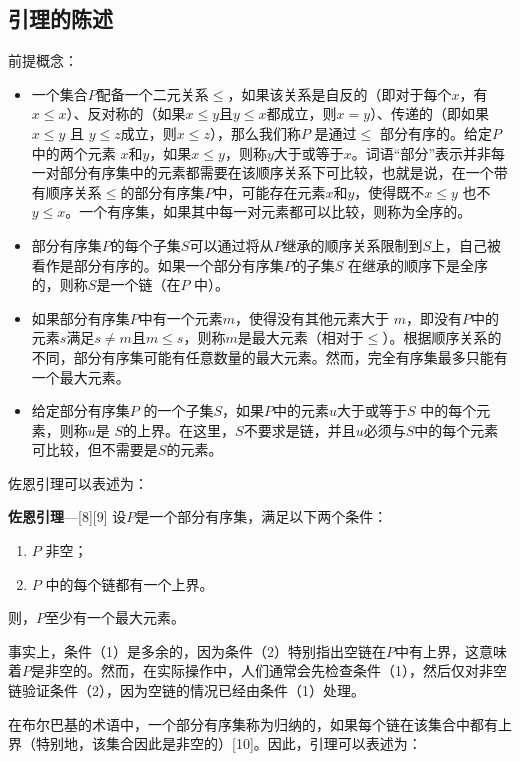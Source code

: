 \subsection{引理的陈述}  
前提概念：
\begin{itemize}
\item 一个集合\( P \)配备一个二元关系\( \leq \)，如果该关系是自反的（即对于每个\( x \)，有\( x \leq x \)）、反对称的（如果\( x \leq y \)且\( y \leq x \)都成立，则\( x = y \)）、传递的（即如果\( x \leq y \) 且 \( y \leq z \)成立，则\( x \leq z \)），那么我们称\( P \) 是通过\( \leq \) 部分有序的。给定\( P \)中的两个元素 \( x \)和\( y \)，如果\( x \leq y \)，则称\( y \)大于或等于\( x \)。词语“部分”表示并非每一对部分有序集中的元素都需要在该顺序关系下可比较，也就是说，在一个带有顺序关系\( \leq \)的部分有序集\( P \)中，可能存在元素\( x \)和\( y \)，使得既不\( x \leq y \) 也不\( y \leq x \)。一个有序集，如果其中每一对元素都可以比较，则称为全序的。
\item 部分有序集\( P \)的每个子集\( S \)可以通过将从\( P \)继承的顺序关系限制到\( S \)上，自己被看作是部分有序的。如果一个部分有序集\( P \)的子集\( S \) 在继承的顺序下是全序的，则称\( S \)是一个链（在\( P \) 中）。
\item 如果部分有序集\( P \)中有一个元素\( m \)，使得没有其他元素大于 \( m \)，即没有\( P \)中的元素\( s \)满足\( s \neq m \)且\( m \leq s \)，则称\( m \)是最大元素（相对于\( \leq \)）。根据顺序关系的不同，部分有序集可能有任意数量的最大元素。然而，完全有序集最多只能有一个最大元素。
\item 给定部分有序集\( P \) 的一个子集\( S \)，如果\( P \)中的元素\( u \)大于或等于\( S \) 中的每个元素，则称\( u \)是 \( S \)的上界。在这里，\( S \)不要求是链，并且\( u \)必须与\( S \)中的每个元素可比较，但不需要是\( S \)的元素。
\end{itemize}
佐恩引理可以表述为：

\textbf{佐恩引理}—[8][9] 设\( P \)是一个部分有序集，满足以下两个条件：
\begin{enumerate}
\item \( P \) 非空；
\item \( P \) 中的每个链都有一个上界。
\end{enumerate}
则，\( P \)至少有一个最大元素。

事实上，条件（1）是多余的，因为条件（2）特别指出空链在\( P \)中有上界，这意味着\( P \)是非空的。然而，在实际操作中，人们通常会先检查条件（1），然后仅对非空链验证条件（2），因为空链的情况已经由条件（1）处理。

在布尔巴基的术语中，一个部分有序集称为归纳的，如果每个链在该集合中都有上界（特别地，该集合因此是非空的）[10]。因此，引理可以表述为：


